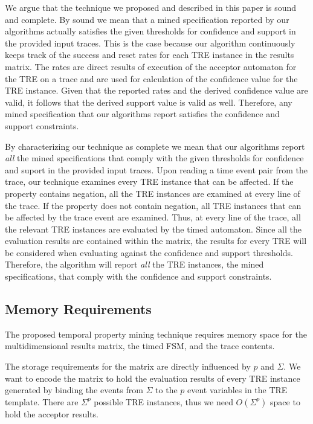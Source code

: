 \documentclass[]{sigplanconf}
\begin{document}
We argue that the technique we proposed and described in this paper is sound and complete. By sound we mean that a mined specification reported by our algorithms actually satisfies the given thresholds for confidence and support in the provided input traces. This is the case because our algorithm continuously keeps track of the success and reset rates for each TRE instance in the results matrix. The rates are direct results of execution of the acceptor automaton for the TRE on a trace and are used for calculation of the confidence value for the TRE instance. Given that the reported rates and the derived confidence value are valid, it follows that the derived support value is valid as well. Therefore, any mined specification that our algorithms report satisfies the confidence and support constraints.

By characterizing our technique as complete we mean that our algorithms report \emph{all} the mined specifications that comply with the given thresholds for confidence and suport in the provided input traces. Upon reading a time event pair from the trace, our technique examines every TRE instance that can be affected. If the property contains negation, all the TRE instances are examined at every line of the trace. If the property does not contain negation, all TRE instances that can be affected by the trace event are examined. Thus, at every line of the trace, all the relevant TRE instances are evaluated by the timed automaton. Since all the evaluation results are contained within the matrix, the results for every TRE will be considered when evaluating against the confidence and support thresholds. Therefore, the algorithm will report \emph{all} the TRE instances, the mined specifications, that comply with the confidence and support constraints.


\subsection{Memory Requirements}

The proposed temporal property mining technique requires memory space for the multidimensional results matrix, the timed FSM, and the trace contents.

The storage requirements for the matrix are directly influenced by $p$ and $\Sigma$.
We want to encode the matrix to hold the evaluation results of every TRE instance generated by binding the events from $\Sigma$ to the $p$ event variables in the TRE template. There are $\Sigma^p$ possible TRE instances, thus we need $O(\Sigma^p)$ space to hold the acceptor results.
\end{document}
